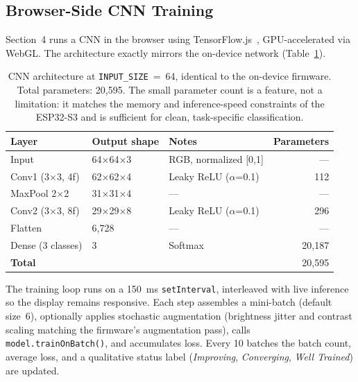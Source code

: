 \documentclass[11pt]{article}
\begin{document}
\subsection{Browser-Side CNN Training}
\label{sec:training}

Section~4 runs a CNN in the browser using TensorFlow.js~\cite{tensorflowjs},
GPU-accelerated via WebGL. The architecture exactly mirrors the on-device network
(Table~\ref{tab:arch}).

\begin{table}[h]
\centering
\caption{CNN architecture at \texttt{INPUT\_SIZE}~=~64, identical to the on-device
         firmware. Total parameters: 20,595. The small parameter count is a feature,
         not a limitation: it matches the memory and inference-speed constraints of
         the ESP32-S3 and is sufficient for clean, task-specific classification.}
\label{tab:arch}
\begin{tabular}{@{}lllr@{}}
\toprule
\textbf{Layer} & \textbf{Output shape} & \textbf{Notes} & \textbf{Parameters} \\
\midrule
Input                   & 64$\times$64$\times$3 & RGB, normalized [0,1]     & ---    \\
Conv1 (3$\times$3, 4f)  & 62$\times$62$\times$4 & Leaky ReLU ($\alpha$=0.1) & 112    \\
MaxPool 2$\times$2      & 31$\times$31$\times$4 & ---                       & ---    \\
Conv2 (3$\times$3, 8f)  & 29$\times$29$\times$8 & Leaky ReLU ($\alpha$=0.1) & 296    \\
Flatten                 & 6,728                 & ---                       & ---    \\
Dense (3 classes)       & 3                     & Softmax                   & 20,187 \\
\midrule
\textbf{Total}          &                       &                           & 20,595 \\
\bottomrule
\end{tabular}
\end{table}

The training loop runs on a 150~ms \texttt{setInterval}, interleaved with live
inference so the display remains responsive. Each step assembles a mini-batch (default
size~6), optionally applies stochastic augmentation (brightness jitter and contrast
scaling matching the firmware's augmentation pass), calls
\texttt{model.trainOnBatch()}, and accumulates loss. Every 10 batches the batch
count, average loss, and a qualitative status label (\textit{Improving},
\textit{Converging}, \textit{Well Trained}) are updated.
\end{document}
